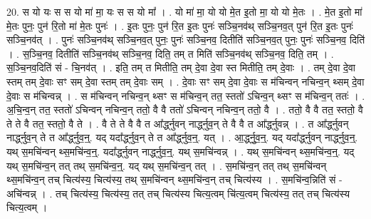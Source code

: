 \documentclass[17pt]{extarticle}
\begin{document}
20. स यो यः स स यो मा॑ मा॒ यः स स यो मा᳚ । . यो मा॑ मा॒ यो यो मे॒त इ॒तो मा॒ यो यो मे॒तः । . मे॒त इ॒तो मा॑ मे॒तः पुनः॒ पुन॑ रि॒तो मा॑ मे॒तः पुनः॑ । . इ॒तः पुनः॒ पुन॑ रि॒त इ॒तः पुनः॑ सञ्चि॒नव॑थ् सञ्चि॒नव॒त् पुन॑ रि॒त इ॒तः पुनः॑ सञ्चि॒नव॑त् । . पुनः॑ सञ्चि॒नव॑थ् सञ्चि॒नव॒त् पुनः॒ पुनः॑ सञ्चि॒नव॒ दितीति॑ सञ्चि॒नव॒त् पुनः॒ पुनः॑ सञ्चि॒नव॒ दिति॑ । . स॒ञ्चि॒नव॒ दितीति॑ सञ्चि॒नव॑थ् सञ्चि॒नव॒ दिति॒ तम् त मिति॑ सञ्चि॒नव॑थ् सञ्चि॒नव॒ दिति॒ तम् । . स॒ञ्चि॒नव॒दिति॑ सं - चि॒नव॑त् । . इति॒ तम् त मितीति॒ तम् दे॒वा दे॒वा स्त मितीति॒ तम् दे॒वाः । . तम् दे॒वा दे॒वा स्तम् तम् दे॒वाः सꣳ सम् दे॒वा स्तम् तम् दे॒वाः सम् । . दे॒वाः सꣳ सम् दे॒वा दे॒वाः स म॑चिन्वन् नचिन्व॒न् थ्सम् दे॒वा दे॒वाः स म॑चिन्वन्न् । . स म॑चिन्वन् नचिन्व॒न् थ्सꣳ स म॑चिन्व॒न् तत॒ स्ततो॑ ऽचिन्व॒न् थ्सꣳ स म॑चिन्व॒न् ततः॑ । . अ॒चि॒न्व॒न् तत॒ स्ततो॑ ऽचिन्वन् नचिन्व॒न् ततो॒ वै वै ततो॑ ऽचिन्वन् नचिन्व॒न् ततो॒ वै । . ततो॒ वै वै तत॒ स्ततो॒ वै ते ते वै तत॒ स्ततो॒ वै ते । . वै ते ते वै वै त आ᳚र्द्ध्नुवन् नार्द्ध्नुव॒न् ते वै वै त आ᳚र्द्ध्नुवन्न् । . त आ᳚र्द्ध्नुवन् नार्द्ध्नुव॒न् ते त आ᳚र्द्ध्नुव॒न्॒. यद् यदा᳚र्द्ध्नुव॒न् ते त आ᳚र्द्ध्नुव॒न्॒. यत् । . आ॒र्द्ध्नु॒व॒न्॒. यद् यदा᳚र्द्ध्नुवन् नार्द्ध्नुव॒न्॒. यथ् स॒मचि॑न्वन् थ्स॒मचि॑न्व॒न्॒. यदा᳚र्द्ध्नुवन् नार्द्ध्नुव॒न्॒. यथ् स॒मचि॑न्वन्न् । . यथ् स॒मचि॑न्वन् थ्स॒मचि॑न्व॒न्॒. यद् यथ् स॒मचि॑न्व॒न् तत् तथ् स॒मचि॑न्व॒न्॒. यद् यथ् स॒मचि॑न्व॒न् तत् । . स॒मचि॑न्व॒न् तत् तथ् स॒मचि॑न्वन् थ्स॒मचि॑न्व॒न् तच् चित्य॑स्य॒ चित्य॑स्य॒ तथ् स॒मचि॑न्वन् थ्स॒मचि॑न्व॒न् तच् चित्य॑स्य । . स॒मचि॑न्व॒न्निति॑ सं - अचि॑न्वन्न् । . तच् चित्य॑स्य॒ चित्य॑स्य॒ तत् तच् चित्य॑स्य चित्य॒त्वम् चि॑त्य॒त्वम् चित्य॑स्य॒ तत् तच् चित्य॑स्य चित्य॒त्वम् । \newline
\end{document}
